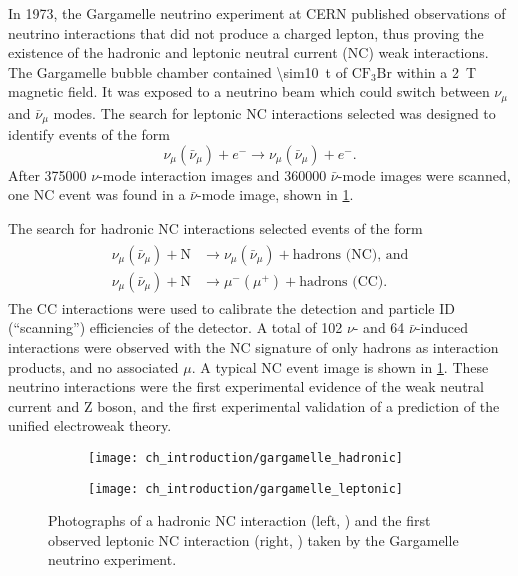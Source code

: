 In 1973, the Gargamelle neutrino experiment at CERN
published observations of neutrino interactions
that did not produce a charged lepton,
thus proving the existence of the hadronic \cite{gargamelle,gargamelle_short}
and leptonic \cite{gargamelle_leptonic} neutral current (NC) weak interactions.
The Gargamelle bubble chamber contained \SI{\sim10}{\tonne} of
$\text{CF}_3\text{Br}$ within a \SI{2}{\tesla} magnetic field.
It was exposed to a neutrino beam which could switch
between $\nu_\mu$ and $\bar{\nu}_\mu$ modes.
The search for leptonic NC interactions selected was designed
to identify events of the form
\begin{equation}\label{eq:leptonic_neutral_current}
    \nu_\mu(\bar{\nu}_\mu) + e^- \to \nu_\mu(\bar{\nu}_\mu) + e^-.
\end{equation}
After \num{375000} $\nu$-mode interaction images
and \num{360000} $\bar{\nu}$-mode images were scanned,
one NC event was found in a $\bar{\nu}$-mode image,
shown in \cref{fig:gargamelle}.

The search for hadronic NC interactions selected events of the form
\begin{align}\label{eq:neutral_current}
    \begin{split}
        \nu_\mu(\bar{\nu}_\mu) + \text{N} &\to \nu_\mu(\bar{\nu}_\mu)
        + \text{hadrons (NC), and} \\
        \nu_\mu(\bar{\nu}_\mu) + \text{N} &\to \mu^-(\mu^+) + \text{hadrons (CC)}.
    \end{split}
\end{align}
The CC interactions were used to calibrate the detection and particle ID (``scanning'')
efficiencies of the detector.
A total of 102 $\nu$- and 64 $\bar{\nu}$-induced interactions were observed
with the NC signature of only hadrons as interaction products,
and no associated $\mu$.
A typical NC event image is shown in \cref{fig:gargamelle}.
These neutrino interactions were the first experimental evidence
of the weak neutral current and Z boson,
and the first experimental validation of a prediction of
the unified electroweak theory.


\begin{figure}
    \centering
    \begin{subfigure}{0.49\textwidth}
        \texttt{[image: ch\_introduction/gargamelle\_hadronic]}
    \end{subfigure}
    \begin{subfigure}{0.49\textwidth}
        \texttt{[image: ch\_introduction/gargamelle\_leptonic]}
    \end{subfigure}
    \caption[Neutral current bubble chamber photographs]{
        Photographs of a hadronic NC interaction (left, \cite{gargamelle})
        and the first observed leptonic NC interaction
        (right, \cite{gargamelle_leptonic_image})
        taken by the Gargamelle neutrino experiment.
    }
    \label{fig:gargamelle}
\end{figure}

